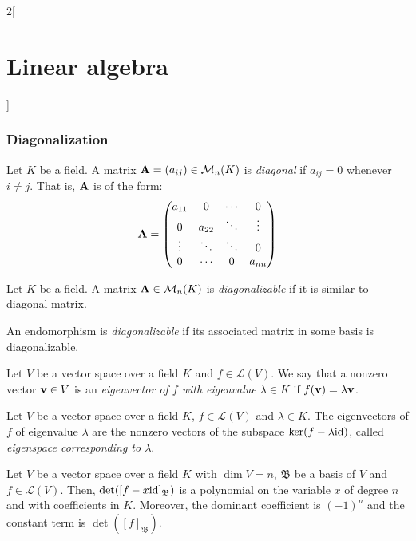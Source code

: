 \documentclass[../../../main.tex]{subfiles}
\begin{document}
\begin{multicols}{2}[\section{Linear algebra}]
    \subsubsection*{Diagonalization}
    \begin{definition}
        Let $K$ be a field. A matrix $\boldsymbol{\mathrm{A}}=(a_{ij})\in\mathcal{M}_n(K)$ is \textit{diagonal} if $a_{ij}=0$ whenever $i\ne j$. That is, $\boldsymbol{\mathrm{A}}$ is of the form:
        $$\boldsymbol{\mathrm{A}}=
            \begin{pmatrix}
                a_{11} & 0      & \cdots & 0      \\
                0      & a_{22} & \ddots & \vdots \\
                \vdots & \ddots & \ddots & 0      \\
                0      & \cdots & 0      & a_{nn}
            \end{pmatrix}
        $$
    \end{definition}
    \begin{definition}
        Let $K$ be a field. A matrix $\boldsymbol{\mathrm{A}}\in\mathcal{M}_n(K)$ is \textit{diagonalizable} if it is similar to diagonal matrix.
    \end{definition}
    \begin{definition}
        An endomorphism is \textit{diagonalizable} if its associated matrix in some basis is diagonalizable.
    \end{definition}
    \begin{definition}
        Let $V$ be a vector space over a field $K$ and $f\in\mathcal{L}(V)$. We say that a nonzero vector $\boldsymbol{\mathrm{v}}\in V$ is an \textit{eigenvector of $f$ with eigenvalue $\lambda\in K$} if $f(\boldsymbol{\mathrm{v}})=\lambda \boldsymbol{\mathrm{v}}$.
    \end{definition}
    \begin{lemma}
        Let $V$ be a vector space over a field $K$, $f\in\mathcal{L}(V)$ and $\lambda\in K$. The eigenvectors of $f$ of eigenvalue $\lambda$ are the nonzero vectors of the subspace $\ker(f-\lambda\mathrm{id})$, called \textit{eigenspace corresponding to $\lambda$}.
    \end{lemma}
    \begin{lemma}
        Let $V$ be a vector space over a field $K$ with $\dim V=n$, $\mathfrak{B}$ be a basis of $V$ and $f\in\mathcal{L}(V)$. Then, $\det([f-x\mathrm{id}]_\mathfrak{B})$ is a polynomial on the variable $x$ of degree $n$ and with coefficients in $K$. Moreover, the dominant coefficient is $(-1)^n$ and the constant term is $\det([f]_\mathfrak{B})$.

\end{lemma}
\end{multicols}
\end{document}

